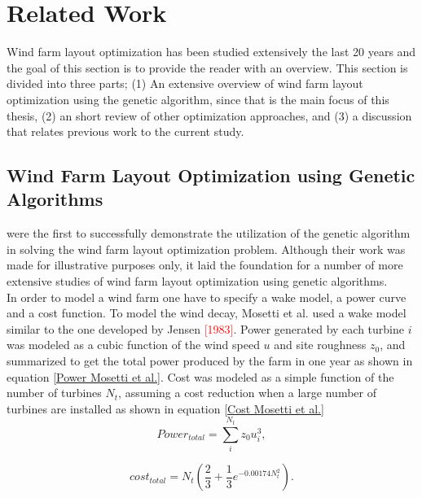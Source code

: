 \chapter{Related Work}
Wind farm layout optimization has been studied extensively the last 20 years and the goal of this section is to provide the reader with an overview. This section is divided into three parts; (1) An extensive overview of wind farm layout optimization using the genetic algorithm, since that is the main focus of this thesis, (2) an short review of other optimization approaches, and (3) a discussion that relates previous work to the current study. 


\section{Wind Farm Layout Optimization using Genetic Algorithms}


\cite{Mosetti} were the first to successfully demonstrate the utilization of the genetic algorithm in solving the wind farm layout optimization problem. Although their work was made for illustrative purposes only, it laid the foundation for a number of more extensive studies of wind farm layout optimization using genetic algorithms.\\

\noindent In order to model a wind farm one have to specify a wake model, a power curve and a cost function. To model the wind decay, Mosetti et al. used a wake model similar to the one developed by Jensen \textcolor{red}{[1983]}. Power generated by each turbine $i$ was modeled as a cubic function of the wind speed $u$ and site roughness $z_0$, and summarized to get the total power produced by the farm in one year as shown in equation \ref{Power Mosetti et al.}. Cost was modeled as a simple function of the number of turbines $N_t$, assuming a cost reduction when a large number of turbines are installed as shown in equation \ref{Cost Mosetti et al.} \\


\begin{equation}
\label{Power Mosetti et al.}
Power_{total} = \sum^{N_t}_{i} z_0u_i^3,
\end{equation}


\begin{equation}
\label{Cost Mosetti et al.}
cost_{total} = N_t \left( \frac{2}{3} + \frac{1}{3}e^{-0.00174N_t^2} \right).
\end{equation}

